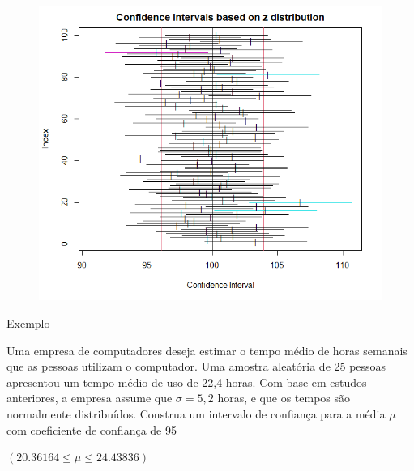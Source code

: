 \documentclass[14pt,aspectratio=1610]{beamer}
\begin{document}
	
	\begin{frame}{}
		\begin{block}{}
			\justifying
			\begin{figure}
				\centering
				\includegraphics[scale=0.6]{figs/IC3.png}
			\end{figure}
		\end{block}
	\end{frame}
	
	\begin{frame}{Exemplo}
		\begin{block}{}
			\justifying
			Uma empresa de computadores deseja estimar o tempo médio de horas semanais que as pessoas utilizam o computador. Uma amostra aleatória de 25 pessoas apresentou um tempo médio de uso de 22,4 horas. Com base em estudos anteriores, a empresa assume que $\sigma = 5,2$ horas, e que os tempos são normalmente distribuídos. Construa um intervalo de confiança para a média $\mu$ com coeficiente de confiança de 95%
		\end{block}
		\pause 
		\begin{block}{}
			$(20.36164\leq \mu\leq24.43836)$
		\end{block}
	\end{frame}
	
\end{document}
